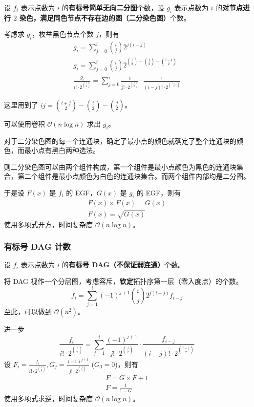 设 $f_i$ 表示点数为 $i$ 的\textbf{有标号简单无向二分图}个数，设 $g_i$ 表示点数为 $i$ 的\textbf{对节点进行 $2$ 染色，满足同色节点不存在边的图（二分染色图）}个数。

考虑求 $g_i$，枚举黑色节点个数 $j$，则有
\[
\begin{gathered}
g_i = \sum_{j = 0}^i \binom{i}{j} 2^{j(i - j)} \\
g_i = \sum_{j = 0}^i \binom{i}{j} 2^{\binom{i}{2} - \binom{j}{2} - \binom{i - j}{2}} \\
\frac{g_i}{i! \cdot 2^{\binom{i}{2}}} = \sum_{j = 0}^i \frac{1}{j! \cdot 2^{\binom{j}{2}}} \cdot \frac{1}{(i - j)! \cdot 2^{\binom{i - j}{2}}}
\end{gathered}
\]

\begin{quoteblock}
这里用到了 $ij = \binom{i + j}{2} - \binom{i}{2} - \binom{j}{2}$。
\end{quoteblock}

可以使用卷积 $\mathcal{O}(n \log n)$ 求出 $g_i$。

对于二分染色图的每一个连通块，确定了最小点的颜色就确定了整个连通块的颜色，而最小点有黑白两种选法。

则二分染色图可以由两个组件构成，第一个组件是最小点颜色为黑色的连通块集合，第二个组件是最小点颜色为白色的连通块集合。而两个组件内部均是二分图。

于是设 $F(x)$ 是 $f_i$ 的 EGF，$G(x)$ 是 $g_i$ 的 EGF，则有
\[
\begin{gathered}
F(x) \times F(x) = G(x) \\
F(x) = \sqrt{G(x)}
\end{gathered}
\]
使用多项式开方，时间复杂度 $\mathcal{O}(n \log n)$。


\subsubsection{有标号 DAG 计数}

设 $f_i$ 表示点数为 $i$ 的\textbf{有标号 DAG（不保证弱连通）}个数。

将 DAG 视作一个分层图，考虑容斥，\textbf{钦定}拓扑序第一层（零入度点）的个数。
\[
f_i = \sum_{j = 1}^{i}(-1)^{j + 1} \binom{i}{j} 2^{j(i - j)}f_{i - j}
\]
至此，可以做到 $\mathcal{O}(n^2)$。

进一步
\[
\frac{f_i}{i! \cdot 2^\binom{i}{2}} = \sum_{j = 1}^i \frac{(-1)^{j + 1}}{j! \cdot 2^\binom{j}{2}} \cdot \frac{f_{i - j}}{(i - j)! \cdot 2^\binom{i - j}{2}}
\]
设 $F_i = \frac{f_i}{i! \cdot 2^\binom{i}{2}}, G_j = \frac{(-1)^{j + 1}}{j! \cdot 2^\binom{j}{2}}$ ($G_0 = 0$)，则有
\[
\begin{gathered}
F = G\times F + 1 \\
F = \frac{1}{1 - G}
\end{gathered}
\]
使用多项式求逆，时间复杂度 $\mathcal{O}(n \log n)$。

